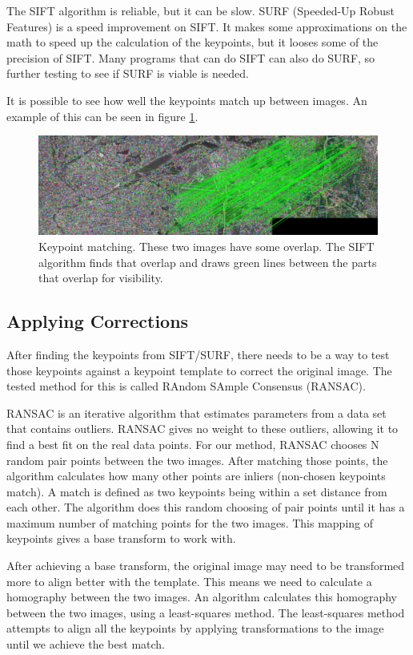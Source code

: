 \documentclass[12pt]{article} %
\begin{document}
	The SIFT algorithm is reliable, but it can be slow. SURF (Speeded-Up Robust Features) is a speed improvement on SIFT. It makes some approximations on the math to speed up the calculation of the keypoints, but it looses some of the precision of SIFT. Many programs that can do SIFT can also do SURF, so further testing to see if SURF is viable is needed.
		
	It is possible to see how well the keypoints match up between images. An example of this can be seen in figure \ref{fig:SIFT_match}. 
	
\begin{figure}[h]
\includegraphics[width=\textwidth]{SIFT_matches.jpeg}
\caption{Keypoint matching. These two images have some overlap. The SIFT algorithm finds that overlap and draws green lines between the parts that overlap for visibility. }
\label{fig:SIFT_match}
\end{figure}

\subsection{Applying Corrections}
	After finding the keypoints from SIFT/SURF, there needs to be a way to test those keypoints against a keypoint template to correct the original image. The tested method for this is called RAndom SAmple Consensus (RANSAC). 
	
	RANSAC is an iterative algorithm that estimates parameters from a data set that contains outliers. RANSAC gives no weight to these outliers, allowing it to find a best fit on the real data points. For our method, RANSAC chooses N random pair points between the two images. After matching those points, the algorithm calculates how many other points are inliers (non-chosen keypoints match). A match is defined as two keypoints being within a set distance from each other. The algorithm does this random choosing of pair points until it has a maximum number of matching points for the two images. This mapping of keypoints gives a base transform to work with.
	
	After achieving a base transform, the original image may need to be transformed more to align better with the template. This means we need to calculate a homography between the two images. An algorithm calculates this homography between the two images, using a least-squares method. The least-squares method attempts to align all the keypoints by applying transformations to the image until we achieve the best match.
\end{document}
